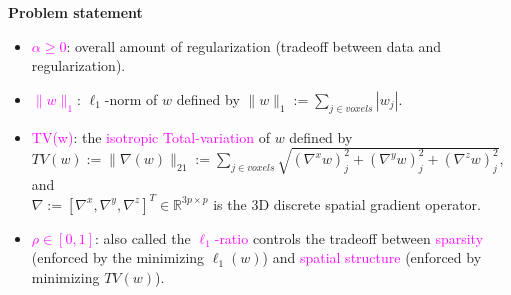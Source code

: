 \documentclass[french]{STIC_poster}
\begin{document}
\begin{frame}[t]
\begin{columns}[t]
\begin{column}{.48\linewidth}
\begin{abox}{\textbf{Problem statement}}
\begin{itemize}
\begin{itemize}
                                      \item \textcolor{magenta}{$\alpha \ge 0$}: overall amount of regularization (tradeoff between data and regularization).
                                        \item \textcolor{magenta}{$\|w\|_1$}: $\ell_1$-norm of $w$ defined by $\|w\|_1 := \sum_{j \in voxels}{|w_j|}$.
                                      \item \textcolor{magenta}{TV(w)}: the \textcolor{magenta}{isotropic Total-variation} of $w$ defined by\\
                                        $TV(w):=\|\nabla(w)\|_{21} :=\sum_{j \in voxels}{\sqrt{(\nabla^xw)_j^2+(\nabla^yw)_j^2+(\nabla^zw)_j^2}}$,
                                        and \\ $\nabla := [\nabla^x,\nabla^y,\nabla^z]^T \in \mathbb{R}^{3p \times p}$
                                        is the 3D discrete spatial gradient operator.
                                      \item \textcolor{magenta}{$\rho \in [0, 1]$}: also called the \textcolor{magenta}{$\ell_1$-ratio} controls the tradeoff between \textcolor{magenta}{sparsity}
                                        (enforced by the minimizing $\ell_1(w)$) and
                                        \textcolor{magenta}{spatial structure} (enforced by minimizing $TV(w)$).


\end{itemize}
\end{itemize}
\end{abox}
\end{column}
\end{columns}
\end{frame}
\end{document}
